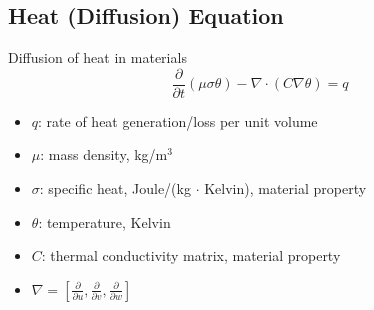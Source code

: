 \documentclass{article}
\begin{document}
\subsection*{Heat (Diffusion) Equation}
Diffusion of heat in materials
\[\frac{\partial}{\partial t}(\mu \sigma \theta) - \nabla \cdot (C \nabla \theta) = q\]
\begin{itemize}
    \item $q$: rate of heat generation/loss per unit volume
    \item $\mu$: mass density, kg/m$^3$
    \item $\sigma$: specific heat, Joule/(kg $\cdot$ Kelvin), material property
    \item $\theta$: temperature, Kelvin
    \item $C$: thermal conductivity matrix, material property
    \item $\nabla = \left[\frac{\partial}{\partial u}, \frac{\partial}{\partial v}, \frac{\partial}{\partial w}\right]$
\end{itemize}
\end{document}
